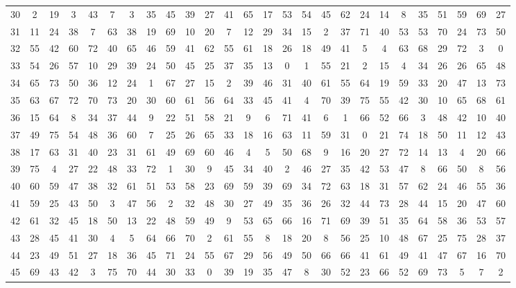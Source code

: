 \begin{table}
\begin{tabular}{c c c c c c c c c c c c c c c c c c c c c c c c c c }
30 & 2 & 19 & 3 & 43 & 7 & 3 & 35 & 45 & 39 & 27 & 41 & 65 & 17 & 53 & 54 & 45 & 62 & 24 & 14 & 8 & 35 & 51 & 59 & 69 & 27 \\
31 & 11 & 24 & 38 & 7 & 63 & 38 & 19 & 69 & 10 & 20 & 7 & 12 & 29 & 34 & 15 & 2 & 37 & 71 & 40 & 53 & 53 & 70 & 24 & 73 & 50 \\
32 & 55 & 42 & 60 & 72 & 40 & 65 & 46 & 59 & 41 & 62 & 55 & 61 & 18 & 26 & 18 & 49 & 41 & 5 & 4 & 63 & 68 & 29 & 72 & 3 & 0 \\
33 & 54 & 26 & 57 & 10 & 29 & 39 & 24 & 50 & 45 & 25 & 37 & 35 & 13 & 0 & 1 & 55 & 21 & 2 & 15 & 4 & 34 & 26 & 26 & 65 & 48 \\
34 & 65 & 73 & 50 & 36 & 12 & 24 & 1 & 67 & 27 & 15 & 2 & 39 & 46 & 31 & 40 & 61 & 55 & 64 & 19 & 59 & 33 & 20 & 47 & 13 & 73 \\
35 & 63 & 67 & 72 & 70 & 73 & 20 & 30 & 60 & 61 & 56 & 64 & 33 & 45 & 41 & 4 & 70 & 39 & 75 & 55 & 42 & 30 & 10 & 65 & 68 & 61 \\
36 & 15 & 64 & 8 & 34 & 37 & 44 & 9 & 22 & 51 & 58 & 21 & 9 & 6 & 71 & 41 & 6 & 1 & 66 & 52 & 66 & 3 & 48 & 42 & 10 & 40 \\
37 & 49 & 75 & 54 & 48 & 36 & 60 & 7 & 25 & 26 & 65 & 33 & 18 & 16 & 63 & 11 & 59 & 31 & 0 & 21 & 74 & 18 & 50 & 11 & 12 & 43 \\
38 & 17 & 63 & 31 & 40 & 23 & 31 & 61 & 49 & 69 & 60 & 46 & 4 & 5 & 50 & 68 & 9 & 16 & 20 & 27 & 72 & 14 & 13 & 4 & 20 & 66 \\
39 & 75 & 4 & 27 & 22 & 48 & 33 & 72 & 1 & 30 & 9 & 45 & 34 & 40 & 2 & 46 & 27 & 35 & 42 & 53 & 47 & 8 & 66 & 50 & 8 & 56 \\
40 & 60 & 59 & 47 & 38 & 32 & 61 & 51 & 53 & 58 & 23 & 69 & 59 & 39 & 69 & 34 & 72 & 63 & 18 & 31 & 57 & 62 & 24 & 46 & 55 & 36 \\
41 & 59 & 25 & 43 & 50 & 3 & 47 & 56 & 2 & 32 & 48 & 30 & 27 & 49 & 35 & 36 & 26 & 32 & 44 & 73 & 28 & 44 & 15 & 20 & 47 & 60 \\
42 & 61 & 32 & 45 & 18 & 50 & 13 & 22 & 48 & 59 & 49 & 9 & 53 & 65 & 66 & 16 & 71 & 69 & 39 & 51 & 35 & 64 & 58 & 36 & 53 & 57 \\
43 & 28 & 45 & 41 & 30 & 4 & 5 & 64 & 66 & 70 & 2 & 61 & 55 & 8 & 18 & 20 & 8 & 56 & 25 & 10 & 48 & 67 & 25 & 75 & 28 & 37 \\
44 & 23 & 49 & 51 & 27 & 18 & 36 & 45 & 71 & 24 & 55 & 67 & 29 & 56 & 49 & 50 & 66 & 66 & 41 & 61 & 49 & 41 & 47 & 67 & 16 & 70 \\
45 & 69 & 43 & 42 & 3 & 75 & 70 & 44 & 30 & 33 & 0 & 39 & 19 & 35 & 47 & 8 & 30 & 52 & 23 & 66 & 52 & 69 & 73 & 5 & 7 & 2 \\

\end{tabular}
\end{table}
